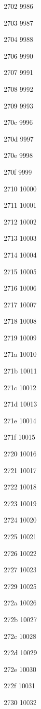 \documentclass[11pt]{article}
\begin{document}
2702 9986 

2703 9987 

2704 9988 

2706 9990 

2707 9991 

2708 9992 

2709 9993 

270c 9996 

270d 9997 

270e 9998 

270f 9999 

2710 10000 

2711 10001 

2712 10002 

2713 10003 \checkmark

2714 10004 

2715 10005 

2716 10006 

2717 10007 

2718 10008 

2719 10009 

271a 10010 

271b 10011 

271c 10012 

271d 10013 

271e 10014 

271f 10015 

2720 10016 \maltese

2721 10017 

2722 10018 

2723 10019 

2724 10020 

2725 10021 

2726 10022 

2727 10023 

2729 10025 

272a 10026 

272b 10027 

272c 10028 

272d 10029 

272e 10030 

272f 10031 

2730 10032 
\end{document}
